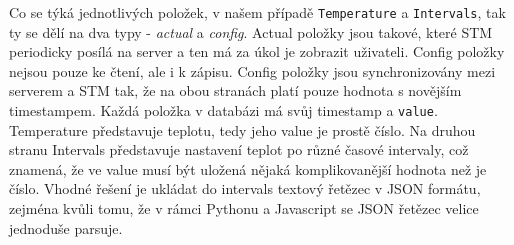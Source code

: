 Co se týká jednotlivých položek, v našem případě \texttt{Temperature} a \texttt{Intervals}, tak ty se
dělí na dva typy - \emph{actual} a \emph{config}.
Actual položky jsou takové, které STM periodicky posílá na server a ten má za úkol je zobrazit uživateli.
Config položky nejsou pouze ke čtení, ale i k zápisu.
Config položky jsou synchronizovány mezi serverem a STM tak, že na obou stranách platí pouze hodnota s
novějším timestampem.
Každá položka v databázi má svůj timestamp a \texttt{value}.
Temperature představuje teplotu, tedy jeho value je prostě číslo.
Na druhou stranu Intervals představuje nastavení teplot po různé časové intervaly, což znamená, že ve
value musí být uložená nějaká komplikovanější hodnota než je číslo.
Vhodné řešení je ukládat do intervals textový řetězec v JSON formátu, zejména kvůli tomu, že v rámci
Pythonu a Javascript se JSON řetězec velice jednoduše parsuje.


